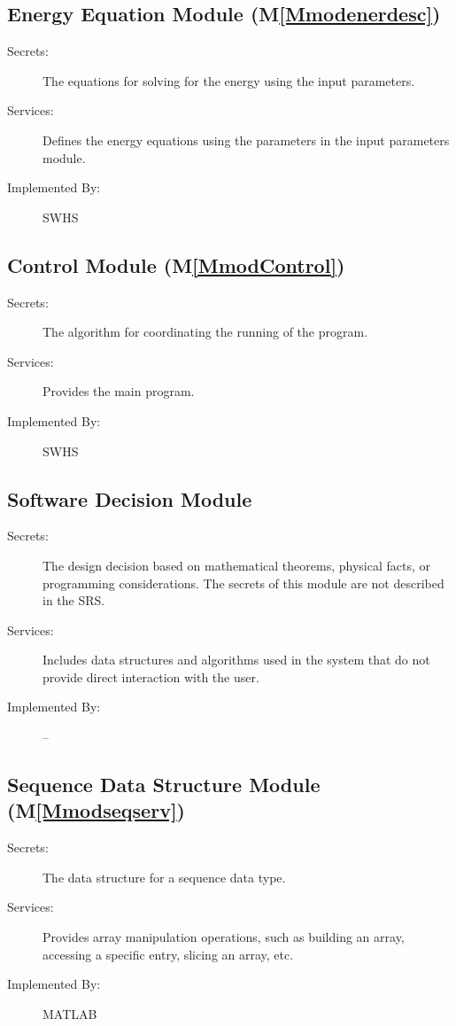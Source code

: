 \documentclass[12pt]{article}
\begin{document}
\subsection{Energy Equation Module (M\ref{Mmodenerdesc})}
\label{Sec:EnerEquaModu()}
\begin{description}
\item[Secrets:]The equations for solving for the energy using the input parameters.
\item[Services:]Defines the energy equations using the parameters in the input parameters module.
\item[Implemented By:]SWHS
\end{description}
\subsection{Control Module (M\ref{MmodControl})}
\label{Sec:ContModu()}
\begin{description}
\item[Secrets:]The algorithm for coordinating the running of the program.
\item[Services:]Provides the main program.
\item[Implemented By:]SWHS
\end{description}
\subsection{Software Decision Module}
\label{Sec:SoftDeciModu}
\begin{description}
\item[Secrets:]The design decision based on mathematical theorems, physical facts, or programming considerations. The secrets of this module are not described in the SRS.
\item[Services:]Includes data structures and algorithms used in the system that do not provide direct interaction with the user.
\item[Implemented By:]--
\end{description}
\subsection{Sequence Data Structure Module (M\ref{Mmodseqserv})}
\label{Sec:SequDataStruModu()}
\begin{description}
\item[Secrets:]The data structure for a sequence data type.
\item[Services:]Provides array manipulation operations, such as building an array, accessing a specific entry, slicing an array, etc.
\item[Implemented By:]MATLAB
\end{description}
\end{document}
